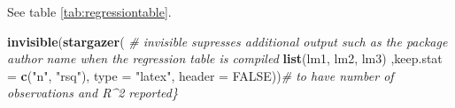 \documentclass[]{book}
\newenvironment{Shaded}{\begin{snugshade}}{\end{snugshade}}
\newcommand{\CommentTok}[1]{\textcolor[rgb]{0.56,0.35,0.01}{\textit{#1}}}
\newcommand{\DataTypeTok}[1]{\textcolor[rgb]{0.13,0.29,0.53}{#1}}
\newcommand{\KeywordTok}[1]{\textcolor[rgb]{0.13,0.29,0.53}{\textbf{#1}}}
\newcommand{\NormalTok}[1]{#1}
\newcommand{\OperatorTok}[1]{\textcolor[rgb]{0.81,0.36,0.00}{\textbf{#1}}}
\newcommand{\OtherTok}[1]{\textcolor[rgb]{0.56,0.35,0.01}{#1}}
\newcommand{\StringTok}[1]{\textcolor[rgb]{0.31,0.60,0.02}{#1}}
\begin{document}
See table \ref{tab:regressiontable}.

\begin{Shaded}
\end{Shaded}

\begin{Shaded}
\begin{Highlighting}[]
\KeywordTok{invisible}\NormalTok{(}\KeywordTok{stargazer}\NormalTok{( }\CommentTok{# invisible supresses additional output such as the package author name when the regression table is compiled}
  \KeywordTok{list}\NormalTok{(lm1, }
\NormalTok{       lm2,}
\NormalTok{       lm3)}
\NormalTok{  ,}\DataTypeTok{keep.stat =} \KeywordTok{c}\NormalTok{(}\StringTok{"n"}\NormalTok{, }\StringTok{"rsq"}\NormalTok{), }\DataTypeTok{type =} \StringTok{"latex"}\NormalTok{, }\DataTypeTok{header =} \OtherTok{FALSE}\NormalTok{))}\CommentTok{# to have number of observations and R^2 reported\}}
\end{Highlighting}
\end{Shaded}
\end{document}
